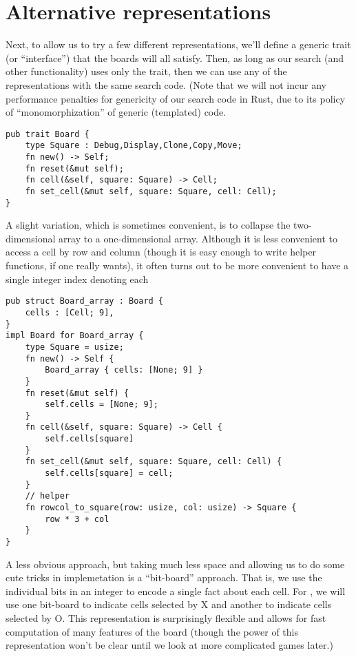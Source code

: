 \documentclass[10pt,dvipdfmx]{report}
\newcommand{\g}[1]{{\sc{#1}}\index{{\sc{#1}}}}
\begin{document}
\section{Alternative representations}

Next, to allow us to try a few different representations, we'll define a generic
trait (or ``interface'') that the boards will all satisfy.  Then, as long as our
search (and other functionality) uses only the trait, then we can use any of the
representations with the same search code.  (Note that we will not incur any
performance penalties for genericity of our search code in Rust, due to its policy
of ``monomorphization'' of generic (templated) code.

{\scriptsize
\begin{verbatim}
pub trait Board {
    type Square : Debug,Display,Clone,Copy,Move;
    fn new() -> Self;
    fn reset(&mut self);
    fn cell(&self, square: Square) -> Cell;
    fn set_cell(&mut self, square: Square, cell: Cell);
}
\end{verbatim}
}


A slight variation, which is sometimes convenient, is to collapse the two-dimensional array
to a one-dimensional array.  Although it is less convenient to access a cell by row and column
(though it is easy enough to write helper functions, if one really wants), it often turns out to
be more convenient to have a single integer index denoting each 
{\scriptsize
\begin{verbatim}
pub struct Board_array : Board {
    cells : [Cell; 9],
}
impl Board for Board_array {
    type Square = usize;
    fn new() -> Self {
        Board_array { cells: [None; 9] }
    }
    fn reset(&mut self) {
        self.cells = [None; 9];
    }
    fn cell(&self, square: Square) -> Cell {
        self.cells[square]
    }
    fn set_cell(&mut self, square: Square, cell: Cell) {
        self.cells[square] = cell;
    }
    // helper
    fn rowcol_to_square(row: usize, col: usize) -> Square {
        row * 3 + col
    }
}
\end{verbatim}
}

A less obvious approach, but taking much less space and allowing us to do some cute tricks
in implemetation is a ``bit-board'' approach.  That is, we use the individual bits in an integer
to encode a single fact about each cell.  For \g{tic-tac-toe}, we will use one bit-board to
indicate cells selected by X and another to indicate cells selected by O.
This representation is surprisingly flexible and allows for fast computation of many
features of the board (though the power of this representation won't be clear until
we look at more complicated games later.)
\end{document}
